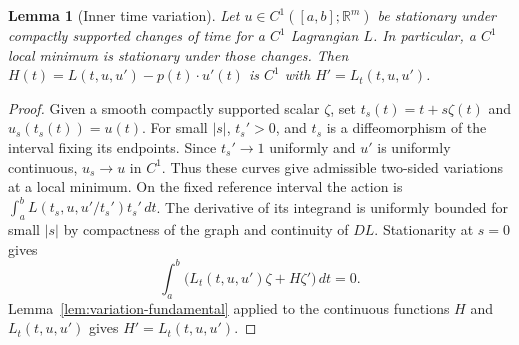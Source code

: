 \documentclass[11pt,oneside,openany]{book}
\theoremstyle{plain}
\newtheorem{lemma}[theorem]{Lemma}
\theoremstyle{definition}
\theoremstyle{remark}
\begin{document}
\begin{lemma}[Inner time variation]
\label{lem:inner-time-variation}
Let \(u\in C^1([a,b];\mathbb R^m)\) be stationary under compactly
supported changes of time for a \(C^1\) Lagrangian \(L\).
In particular, a \(C^1\) local minimum is stationary under those
changes. Then \(H(t)=L(t,u,u')-p(t)\cdot u'(t)\) is \(C^1\)
with \(H'=L_t(t,u,u')\).
\end{lemma}
\begin{proof}
Given a smooth compactly supported scalar \(\zeta\), set
\(t_s(t)=t+s\zeta(t)\) and \(u_s(t_s(t))=u(t)\).
For small \(|s|\), \(t_s'>0\), and \(t_s\) is a diffeomorphism
of the interval fixing its endpoints. Since \(t_s'\to1\)
uniformly and \(u'\) is uniformly continuous, \(u_s\to u\) in
\(C^1\). Thus these curves give admissible two-sided variations
at a local minimum. On the fixed reference interval the action
is \(\int_a^b L(t_s,u,u'/t_s')t_s'\,dt\).
The derivative of its integrand is uniformly bounded for small
\(|s|\) by compactness of the graph and continuity of \(DL\).
Stationarity at \(s=0\) gives
\[
 \int_a^b \bigl(L_t(t,u,u')\zeta+H\zeta'\bigr)\,dt=0 .
\]
Lemma~\ref{lem:variation-fundamental} applied to the continuous
functions \(H\) and \(L_t(t,u,u')\) gives \(H'=L_t(t,u,u')\).
\end{proof}
\end{document}
